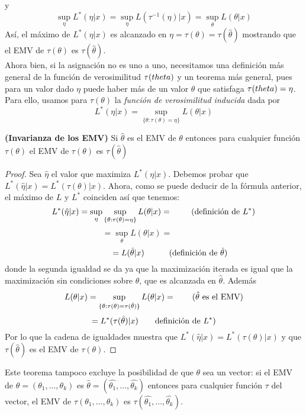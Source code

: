 y
\[ \sup_{\eta}L^{*}(\eta \vert x) = \sup_{\eta}L(\tau^{-1}(\eta) \vert x) = \sup_{\theta}L(\theta \vert x) \]
Así, el máximo de $L^{*}(\eta \vert x) $ es alcanzado en $\eta = \tau(\theta) = \tau(\hat{\theta})$ mostrando que el EMV de $\tau(\theta)$ es $\tau(\hat{\theta})$.\\
Ahora bien, si la asignación no es uno a uno, necesitamos una definición más general de  la función de verosimilitud $\tau(\\theta)$ y un teorema más general, pues para un valor dado $\eta$ puede haber más de un valor $\theta$ que satisfaga $\tau(\\theta) = \eta$.\\
Para ello, usamos para $\tau(\theta)$ la \textit{función de verosimilitud inducida} dada por \[ L^{*}(\eta \vert x) = \sup_{\lbrace \theta:\tau(\theta)=\eta \rbrace} L(\theta \vert x) \]
\begin{teorema}
\textbf{(Invarianza de los EMV)} Si $\hat{\theta}$ es el EMV de $\theta$  entonces para cualquier función $\tau(\theta)$ el EMV de $\tau(\theta)$ es $\tau(\hat{\theta})$
\end{teorema}
\begin{proof}
Sea $\hat{\eta}$ el valor que maximiza $L^{*}(\eta \vert x)$. Debemos probar que $L^{*}(\hat{\eta} \vert x) = L^{*}(\tau(\theta) \vert x)$. Ahora, como se puede deducir de la fórmula anterior, el máximo de $L$ y $L^{*}$ coinciden así que tenemos: 
\[ L^{*}(\hat{\eta} \vert x) = \sup_{\eta} \sup_{\lbrace \theta:\tau(\theta)=\eta \rbrace} L(\theta \vert x)= \quad \quad \textnormal{ (definición de } L^{*} \textnormal{)} \]
\[ =\sup_{\theta}L(\theta \vert x) = \quad \quad \quad \quad \]
\[\quad \quad \quad \quad  = L(\hat{\theta} \vert x) \quad \quad \quad \textnormal{(definición de } \hat{\theta} \textnormal{)} \]
donde la segunda igualdad se da ya que la maximización iterada es igual que la maximización sin condiciones sobre $\theta$, que es alcanzada en $\hat{\theta}$. Además
\[ L(\theta \vert x) = \sup_{\lbrace \theta:\tau(\theta)=\tau(\hat{\theta}) \rbrace} L(\theta \vert x)= \quad \quad \textnormal{(} \hat{\theta} \textnormal{ es el EMV)} \]
\[ =L^{*}(\tau(\hat{\theta}) \vert x) \quad \quad \textnormal{definición de } L^{*} \textnormal{)} \]
Por lo que la cadena de igualdades muestra que $L^{*}(\hat{\eta} \vert x) = L^{*}(\tau(\theta) \vert x)$ y que $\tau(\hat{\theta})$ es el EMV de $\tau(\theta)$.
\end{proof}
Este teorema tampoco excluye la posibilidad de que $\theta$ sea un vector: si el EMV de $\theta=(\theta_{1},...,\theta_{k})$ es $\hat{\theta}=(\hat{\theta_{1}},...,\hat{\theta_{k}})$ entonces para cualquier función $\tau$ del vector, el EMV de $\tau(\theta_{1},...,\theta_{k})$ es $\tau(\hat{\theta_{1}},...,\hat{\theta_{k}})$. \cite{garthwaite2002statistical}
